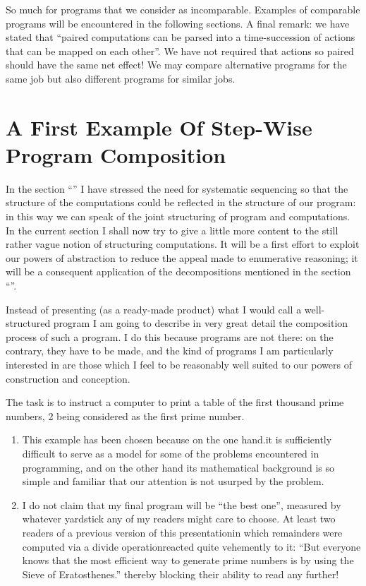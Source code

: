 So much for programs that we consider as incomparable. Examples of comparable programs will be encountered in the following sections. A final remark: we have stated that ``paired computations can be parsed into a time-succession of actions that can be mapped on each other''. We have not required that actions so paired should have the same net effect! We may compare alternative programs for the same job but also different programs for similar jobs.

\section[A first example of step-wise program composition]{A First Example Of Step-Wise Program Composition}
\label{sec:first-example-step-wise-program-composition}

In the section ``'' I have stressed the need for systematic sequencing so that the structure of the computations could be reflected in the structure of our program: in this way we can speak of the joint structuring of program and computations. In the current section I shall now try to give a little more content to the still rather vague notion of structuring computations. It will be a first effort to exploit our powers of abstraction to reduce the appeal made to enumerative reasoning; it will be a consequent application of the decompositions mentioned in the section ``''.

Instead of presenting (as a ready-made product) what I would call a well-structured program I am going to describe in very great detail the composition process of such a program. I do this because programs are not there: on the contrary, they have to be made, and the kind of programs I am particularly interested in are those which I feel to be reasonably well suited to our powers of construction and conception.

The task is to instruct a computer to print a table of the first thousand prime numbers, 2 being considered as the first prime number.

\begin{enumerate}[leftmargin=*, itemindent=2.2\parindent, label=\textit{Note }\arabic*.]
	\item This example has been chosen because on the one hand.it is sufficiently difficult to serve as a model for some of the problems encountered in programming, and on the other hand its mathematical background is so simple and familiar that our attention is not usurped by the problem.
	
	\item I do not claim that my final program will be ``the best one'', measured by whatever yardstick any of my readers might care to choose. At least two readers of a previous version of this presentation\textemdash{}in which remainders were computed via a divide operation\textemdash{}reacted quite vehemently to it: ``But everyone knows that the most efficient way to generate prime numbers is by using the Sieve of Eratosthenes.'' thereby blocking their ability to read any further!
\end{enumerate}


